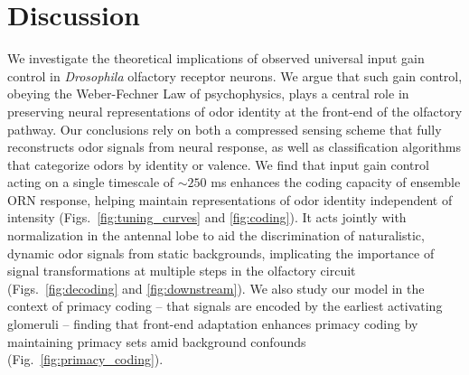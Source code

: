 \documentclass[9pt,twocolumn,twoside,lineno]{pnas-new}
\begin{document}














\section*{Discussion}



We investigate the theoretical implications of observed universal input gain control in \textit{Drosophila} olfactory receptor neurons. We argue that such gain control, obeying the Weber-Fechner Law of psychophysics, plays a central role in preserving neural representations of odor identity at the front-end of the olfactory pathway. Our conclusions rely on both a compressed sensing scheme that fully reconstructs odor signals from neural response, as well as classification algorithms that categorize odors by identity or valence. We find that input gain control acting on a single timescale of $\sim 250$ ms enhances the coding capacity of ensemble ORN response, helping maintain representations of odor identity independent of intensity (Figs.~\ref{fig:tuning_curves} and  \ref{fig:coding}). %
It acts jointly with normalization in the antennal lobe to aid the discrimination of naturalistic, dynamic odor signals from static backgrounds, implicating the importance of signal transformations at multiple steps in the olfactory circuit (Figs.~\ref{fig:decoding} and \ref{fig:downstream}). We also study our model in the context of primacy coding -- that signals are encoded by the earliest activating glomeruli -- finding that front-end adaptation enhances primacy coding by maintaining primacy sets amid background confounds (Fig.~\ref{fig:primacy_coding}).
\end{document}
